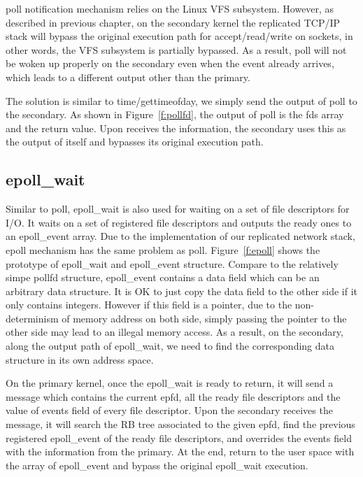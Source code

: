 poll notification mechanism relies on the Linux VFS subsystem. However, as described in previous chapter, on the secondary kernel the replicated TCP/IP stack will bypass the original execution path for accept/read/write on sockets, in other words, the VFS subsystem is partially bypassed. As a result, poll will not be woken up properly on the secondary even when the event already arrives, which leads to a different output other than the primary.

The solution is similar to time/gettimeofday, we simply send the output of poll to the secondary. As shown in Figure~\ref{f:pollfd}, the output of poll is the fds array and the return value. Upon receives the information, the secondary uses this as the output of itself and bypasses its original execution path.

\subsection{epoll\_wait}
Similar to poll, epoll\_wait is also used for waiting on a set of file descriptors for I/O. It waits on a set of registered file descriptors and outputs the ready ones to an epoll\_event array. Due to the implementation of our replicated network stack, epoll mechanism has the same problem as poll. Figure~\ref{f:epoll} shows the prototype of epoll\_wait and epoll\_event structure. Compare to the relatively simpe pollfd structure, epoll\_event contains a data field which can be an arbitrary data structure. It is OK to just copy the data field to the other side if it only contains integers. However if this field is a pointer, due to the non-determinism of memory address on both side, simply passing the pointer to the other side may lead to an illegal memory access. As a result, on the secondary, along the output path of epoll\_wait, we need to find the corresponding data structure in its own address space.

On the primary kernel, once the epoll\_wait is ready to return, it will send a message which contains the current epfd, all the ready file descriptors and the value of events field of every file descriptor. Upon the secondary receives the message, it will search the RB tree associated to the given epfd, find the previous registered epoll\_event of the ready file descriptors, and overrides the events field with the information from the primary. At the end, return to the user space with the array of epoll\_event and bypass the original epoll\_wait execution.

